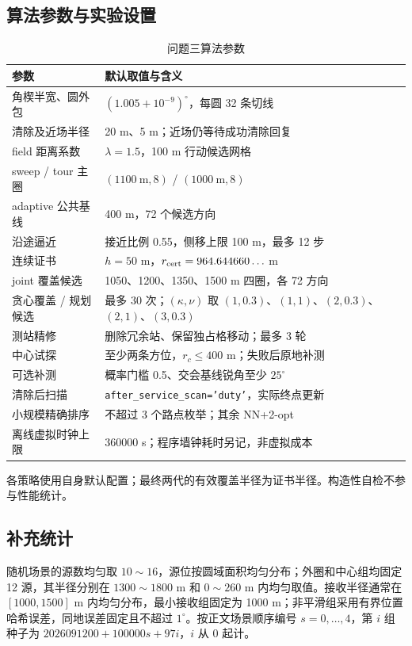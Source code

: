 \subsection{算法参数与实验设置}
\begin{table}[H]\centering
\caption{问题三算法参数}
\begin{tabular}{@{}p{}p{}@{}}\toprule
参数 & 默认取值与含义\\\midrule
角楔半宽、圆外包 & $(1.005+10^{-9})^\circ$，每圆 32 条切线\\
清除及近场半径 & 20 m、5 m；近场仍等待成功清除回复\\
field 距离系数 & $\lambda=1.5$，100 m 行动候选网格\\
sweep / tour 主圈 & $(1100\ \mathrm{m},8)$ / $(1000\ \mathrm{m},8)$\\
adaptive 公共基线 & 400 m，72 个候选方向\\
沿途逼近 & 接近比例 0.55，侧移上限 100 m，最多 12 步\\
连续证书 & $h=50$ m，$r_{\rm cert}=964.644660\ldots$ m\\
joint 覆盖候选 & 1050、1200、1350、1500 m 四圈，各 72 方向\\
贪心覆盖 / 规划候选 & 最多 30 次；$(\kappa,\nu)$ 取 $(1,0.3)$、$(1,1)$、$(2,0.3)$、$(2,1)$、$(3,0.3)$\\
测站精修 & 删除冗余站、保留独占格移动；最多 3 轮\\
中心试探 & 至少两条方位，$r_c\le400$ m；失败后原地补测\\
可选补测 & 概率门槛 0.5、交会基线锐角至少 $25^\circ$\\
清除后扫描 & \texttt{after\_service\_scan='duty'}，实际终点更新\\
小规模精确排序 & 不超过 3 个路点枚举；其余 NN+2-opt\\
离线虚拟时钟上限 & 360000 s；程序墙钟耗时另记，非虚拟成本\\\bottomrule
\end{tabular}\end{table}
各策略使用自身默认配置；最终两代的有效覆盖半径为证书半径。构造性自检不参与性能统计。

\newpage
\subsection{补充统计}
随机场景的源数均匀取 $10\sim16$，源位按圆域面积均匀分布；外圈和中心组均固定 12 源，其半径分别在 $1300\sim1800$ m 和 $0\sim260$ m 内均匀取值。接收半径通常在 $[1000,1500]$ m 内均匀分布，最小接收组固定为 1000 m；非平滑组采用有界位置哈希误差，同地误差固定且不超过 $1^\circ$。按正文场景顺序编号 $s=0,\ldots,4$，第 $i$ 组种子为 $2026091200+100000s+97i$，$i$ 从 0 起计。

